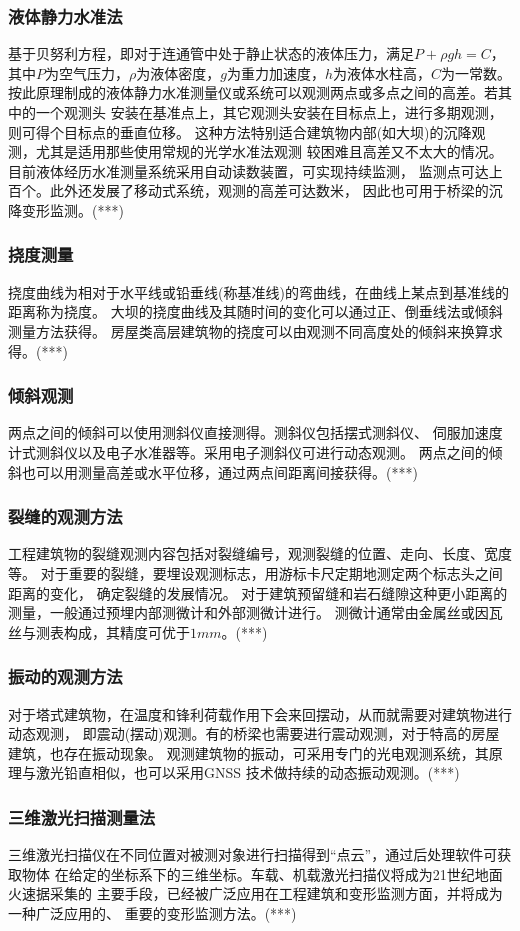 \subsubsection{液体静力水准法}
基于贝努利方程，即对于连通管中处于静止状态的液体压力，满足$P+{\rho}gh=C$，
其中$P$为空气压力，$\rho$为液体密度，$g$为重力加速度，$h$为液体水柱高，$C$为一常数。
按此原理制成的液体静力水准测量仪或系统可以观测两点或多点之间的高差。若其中的一个观测头
安装在基准点上，其它观测头安装在目标点上，进行多期观测，则可得个目标点的垂直位移。
这种方法特别适合建筑物内部(如大坝)的沉降观测，尤其是适用那些使用常规的光学水准法观测
较困难且高差又不太大的情况。目前液体经历水准测量系统采用自动读数装置，可实现持续监测，
监测点可达上百个。此外还发展了移动式系统，观测的高差可达数米，
因此也可用于桥梁的沉降变形监测。(***)
\subsubsection{挠度测量}
挠度曲线为相对于水平线或铅垂线(称基准线)的弯曲线，在曲线上某点到基准线的距离称为挠度。
大坝的挠度曲线及其随时间的变化可以通过正、倒垂线法或倾斜测量方法获得。
房屋类高层建筑物的挠度可以由观测不同高度处的倾斜来换算求得。(***)
\subsubsection{倾斜观测}
两点之间的倾斜可以使用测斜仪直接测得。测斜仪包括摆式测斜仪、
伺服加速度计式测斜仪以及电子水准器等。采用电子测斜仪可进行动态观测。
两点之间的倾斜也可以用测量高差或水平位移，通过两点间距离间接获得。(***)
\subsubsection{裂缝的观测方法}
工程建筑物的裂缝观测内容包括对裂缝编号，观测裂缝的位置、走向、长度、宽度等。
对于重要的裂缝，要埋设观测标志，用游标卡尺定期地测定两个标志头之间距离的变化，
确定裂缝的发展情况。
对于建筑预留缝和岩石缝隙这种更小距离的测量，一般通过预埋内部测微计和外部测微计进行。
测微计通常由金属丝或因瓦丝与测表构成，其精度可优于$1mm$。(***)
\subsubsection{振动的观测方法}
对于塔式建筑物，在温度和锋利荷载作用下会来回摆动，从而就需要对建筑物进行动态观测，
即震动(摆动)观测。有的桥梁也需要进行震动观测，对于特高的房屋建筑，也存在振动现象。
观测建筑物的振动，可采用专门的光电观测系统，其原理与激光铅直相似，也可以采用GNSS
技术做持续的动态振动观测。(***)
\subsubsection{三维激光扫描测量法}
三维激光扫描仪在不同位置对被测对象进行扫描得到“点云”，通过后处理软件可获取物体
在给定的坐标系下的三维坐标。车载、机载激光扫描仪将成为21世纪地面火速据采集的
主要手段，已经被广泛应用在工程建筑和变形监测方面，并将成为一种广泛应用的、
重要的变形监测方法。(***)

